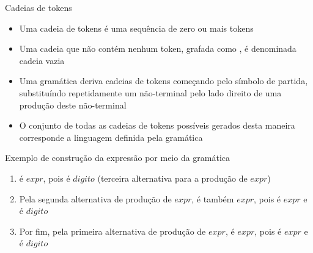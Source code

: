 \begin{frame}[fragile]{Cadeias de tokens}

    \begin{itemize}
        \item Uma cadeia de tokens é uma sequência de zero ou mais tokens

        \item Uma cadeia que não contém nenhum token, grafada como , é denominada cadeia vazia

        \item Uma gramática deriva cadeias de tokens começando pelo símbolo de partida, substituíndo repetidamente um não-terminal pelo lado direito de uma
            produção deste não-terminal

        \item O conjunto de todas as cadeias de tokens possíveis gerados desta maneira corresponde a linguagem definida pela gramática
    \end{itemize}

\end{frame}

\begin{frame}[fragile]{Exemplo de construção da expressão  por meio da gramática}

    \begin{enumerate}
        \item {} é $expr$, pois  é $digito$ (terceira alternativa para a produção de $expr$)

        \item Pela segunda alternativa de produção de $expr$,   é também $expr$, pois  é $expr$ e  é $digito$

        \item Por fim, pela primeira alternativa de produção de $expr$,  é $expr$, pois  é $expr$ e  é $digito$
    \end{enumerate}

\end{frame}

